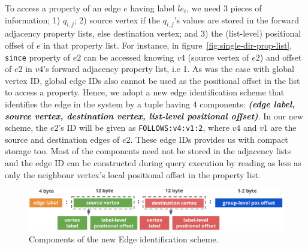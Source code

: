 To access a property of an edge $e$ having label $le_i$, we need 3 pieces of information; 1) $q_{i,j}$; 2) source vertex if the $q_{i,j}$'s values are stored in the forward adjacency property lists, else destination vertex; and 3) the (list-level) positional offset of $e$ in that property list. For instance, in figure~\ref{fig:single-dir-prop-list}, \texttt{since} property of $e2$ can be accessed knowing $v4$ (source vertex of $e2$) and offset of $e2$ in $v4$'s forward adjacency property list, i.e 1. As was the case with global vertex ID, global edge IDs also cannot be used as the positional offset in the list to access a property. Hence, we adopt a new edge identification scheme that identifies the edge in the system by a tuple having 4 components: \textbf{\emph{(edge label, source vertex, destination vertex, list-level positional offset)}}. In our new scheme, the $e2$'s ID will be given as \texttt{FOLLOWS:v4:v1:2}, where $v4$ and $v1$ are the source and destination edges of $e2$. These edge IDs provides us with compact storage too. Most of the components need not be stored in the adjacency lists and the edge ID can be constructed during query execution by reading as less as only the neighbour vertex's local positional offset in the property list. 

\begin{figure}
	\vspace{-25pt}
	\hfill\includegraphics[scale=0.78]{img/edge-scheme}\hspace*{\fill}
	\captionsetup{justification=centering}
	\caption{Components of the new Edge identification scheme.}
	\label{fig:edge-scheme}
\end{figure}

